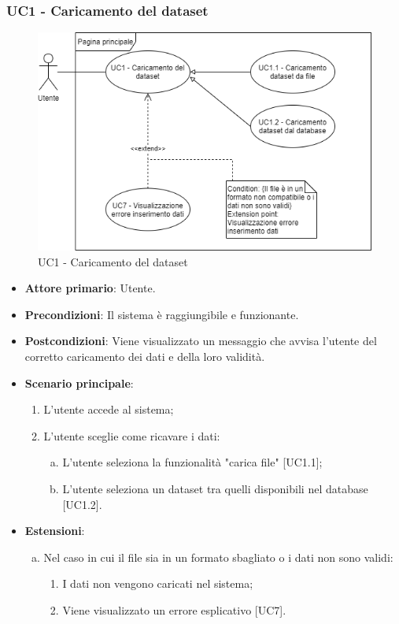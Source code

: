 \subsubsection{UC1 - Caricamento del dataset}
\begin{figure}[h]
\includegraphics[width=\linewidth]{section/Images/UC1.png}
\centering
\caption{UC1 - Caricamento del dataset}
\end{figure}
\begin{itemize}
	\item \textbf{Attore primario}: Utente.
	\item \textbf{Precondizioni}: Il sistema è raggiungibile e funzionante.
	\item \textbf{Postcondizioni}: Viene visualizzato un messaggio che avvisa l'utente del corretto caricamento dei dati e della loro validità.
	\item \textbf{Scenario principale}:
		\begin{enumerate}
			\item L'utente accede al sistema;
			\item L'utente sceglie come ricavare i dati:
				\begin{enumerate}[(a)]
			\item L'utente seleziona la funzionalità "carica file" [UC1.1];
			\item L'utente seleziona un dataset tra quelli disponibili nel database [UC1.2].
				\end{enumerate}
		\end{enumerate}
	\item \textbf{Estensioni}:
	\begin{enumerate}[(a)]
		\item Nel caso in cui il file sia in un formato sbagliato o i dati non sono validi:
		\begin{enumerate}[1.]
			\item I dati non vengono caricati nel sistema;
			\item Viene visualizzato un errore esplicativo [UC7].
		\end{enumerate}
	\end{enumerate}
\end{itemize}

